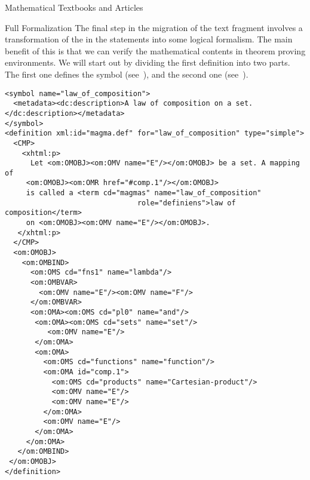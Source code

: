 \begin{tchapter}[id=algebra,short=Textbooks and Articles]{Mathematical Textbooks and Articles}
\begin{tsection}[id=formalization]{Full Formalization}
  The final step in the migration of the text fragment involves a transformation of the
  {} in the statements into some logical formalism. The
  main benefit of this is that we can verify the mathematical contents in theorem proving
  environments.  We will start out by dividing the first definition into two parts. The
  first one defines the symbol {}
  (see~), and the second one {}
  (see~).

\begin{lstlisting}[label=lst:law_of_composition-formal,
    caption={The formal definition of a law of composition},
    index={definition,CMP,OMOBJ,OMBIND,OMBVAR,OMS,OMA,OMV}]
<symbol name="law_of_composition">
  <metadata><dc:description>A law of composition on a set.</dc:description></metadata>
</symbol>
<definition xml:id="magma.def" for="law_of_composition" type="simple">
  <CMP> 
    <xhtml:p>
      Let <om:OMOBJ><om:OMV name="E"/></om:OMOBJ> be a set. A mapping of 
     <om:OMOBJ><om:OMR href="#comp.1"/></om:OMOBJ> 
     is called a <term cd="magmas" name="law_of_composition" 
                               role="definiens">law of composition</term>
     on <om:OMOBJ><om:OMV name="E"/></om:OMOBJ>.
   </xhtml:p>
  </CMP>
  <om:OMOBJ>
    <om:OMBIND>
      <om:OMS cd="fns1" name="lambda"/>
      <om:OMBVAR>
        <om:OMV name="E"/><om:OMV name="F"/>
      </om:OMBVAR>
      <om:OMA><om:OMS cd="pl0" name="and"/>
       <om:OMA><om:OMS cd="sets" name="set"/>
          <om:OMV name="E"/>
       </om:OMA>
       <om:OMA>
         <om:OMS cd="functions" name="function"/>
         <om:OMA id="comp.1">
           <om:OMS cd="products" name="Cartesian-product"/>
           <om:OMV name="E"/>
           <om:OMV name="E"/>
         </om:OMA>
         <om:OMV name="E"/>
       </om:OMA>
     </om:OMA>
   </om:OMBIND>
 </om:OMOBJ>
</definition>
\end{lstlisting}


\end{tsection}
\end{tchapter}
